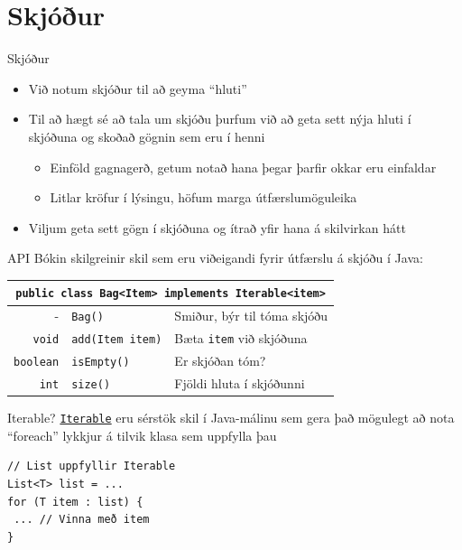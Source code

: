 \documentclass{beamer}
\begin{document}

\section{Skjóður}

\begin{frame}{Skjóður}
	\begin{itemize}
		\item Við notum skjóður til að geyma ``hluti''
		\item Til að hægt sé að tala um skjóðu þurfum við að geta sett nýja hluti í skjóðuna og skoðað gögnin sem eru í henni
		      \begin{itemize}
			      \item Einföld gagnagerð, getum notað hana þegar þarfir okkar eru einfaldar
			      \item Litlar kröfur í lýsingu, höfum marga útfærslumöguleika
		      \end{itemize}
		\item Viljum geta sett gögn í skjóðuna og ítrað yfir hana á skilvirkan hátt
	\end{itemize}
\end{frame}

\begin{frame}{API}
	Bókin skilgreinir skil sem eru viðeigandi fyrir útfærslu á skjóðu í Java:
	\begin{center}
		\begin{tabular}{rll}
			\toprule
			\multicolumn{3}{c}{\texttt{public class Bag<Item> implements Iterable<item>}} \\
			\midrule
			-                & \texttt{Bag()}          & Smiður, býr til tóma skjóðu      \\
			\texttt{void}    & \texttt{add(Item item)} & Bæta \texttt{item} við skjóðuna  \\
			\texttt{boolean} & \texttt{isEmpty()}      & Er skjóðan tóm?                  \\
			\texttt{int}     & \texttt{size()}         & Fjöldi hluta í skjóðunni         \\
			\bottomrule
		\end{tabular}
	\end{center}
\end{frame}

\begin{frame}[fragile]{Iterable?}
	\href{https://docs.oracle.com/javase/8/docs/api/java/lang/Iterable.html}{\texttt{Iterable}} eru sérstök skil í Java-málinu sem gera það mögulegt að nota ``foreach'' lykkjur á tilvik klasa sem uppfylla þau
	\vspace*{1cm}
	\begin{verbatim}
// List uppfyllir Iterable
List<T> list = ... 
for (T item : list) {
 ... // Vinna með item
}
\end{verbatim}
\end{frame}
\end{document}

